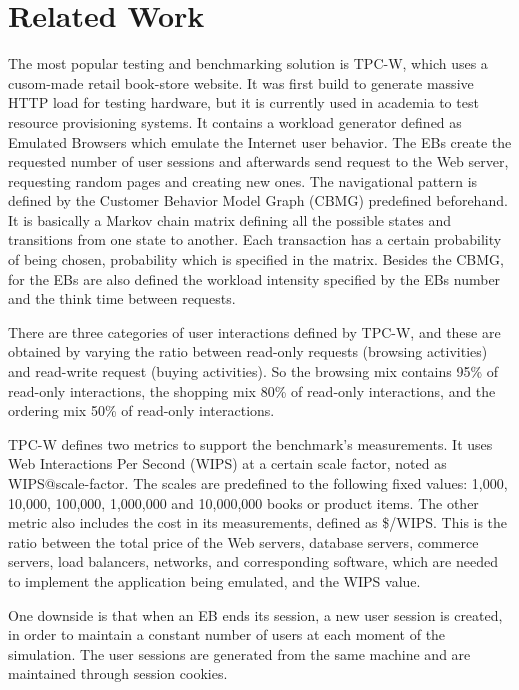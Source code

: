 \chapter{Related Work}
\label{chapter:chapter2}

The most popular testing and benchmarking solution is TPC-W, which uses a cusom-made retail book-store website. It was first build to generate massive HTTP load for testing hardware, but it is currently used in academia to test resource provisioning systems. It contains a workload generator defined as Emulated Browsers which emulate the Internet user behavior. The EBs create the requested number of user sessions and afterwards send request to the Web server, requesting random pages and creating new ones. The navigational pattern is defined by the Customer Behavior Model Graph (CBMG) predefined beforehand. It is basically a Markov chain matrix defining all the possible states and transitions from one state to another. Each transaction has a certain probability of being chosen, probability which is specified in the matrix. Besides the CBMG, for the EBs are also defined the workload intensity specified by the EBs number and the think time between requests.

	There are three categories of user interactions defined by TPC-W, and these are obtained by varying the ratio between read-only requests (browsing activities) and read-write request (buying activities). So the browsing mix contains 95\% of read-only interactions, the shopping mix 80\% of read-only interactions, and the  ordering mix 50\% of  read-only interactions.

TPC-W defines two metrics to support the benchmark's measurements. It uses Web Interactions Per Second (WIPS) at a certain scale factor, noted as WIPS@scale-factor. The scales are predefined to the following fixed values: 1,000, 10,000, 100,000, 1,000,000 and 10,000,000 books or product items. The other metric also includes the cost in its measurements, defined as \$/WIPS. This is the ratio between the total price of the Web servers, database servers, commerce servers, load balancers, networks, and corresponding software, which are needed to implement the application being emulated, and the WIPS value. 

One downside is that when an EB ends its session, a new user session is created, in order to maintain a constant number of users at each moment of the simulation. The user sessions are generated from the same machine and are maintained through session cookies.

